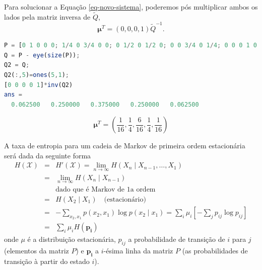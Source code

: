 \begin{questions}
\begin{solution}
\begin{parts}
Para solucionar a Equação \ref{eq-novo-sistema}, poderemos pós multiplicar ambos os lados
pela matriz inversa de $\tilde{Q}$,
\begin{equation}
\mathbf{\mu}^T = (0, 0, 0, 1) \tilde{Q}^{-1} .
\end{equation}


\begin{lstlisting}[language=Octave]
P = [0 1 0 0 0; 1/4 0 3/4 0 0; 0 1/2 0 1/2 0; 0 0 3/4 0 1/4; 0 0 0 1 0];
Q = P - eye(size(P));
Q2 = Q;
Q2(:,5)=ones(5,1);
[0 0 0 0 1]*inv(Q2)
ans =
  0.062500   0.250000   0.375000   0.250000   0.062500
\end{lstlisting}

\begin{equation}
\mathbf{\mu}^T = \left( \frac{1}{16}, \frac{1}{4}, \frac{6}{16}, \frac{1}{4}, \frac{1}{16} \right)
\end{equation}


A taxa de entropia para um cadeia de Markov de primeira ordem
estacionária será dada da seguinte forma
  \begin{eqnarray}
  H(\mathcal{X}) &=& H'(\mathcal{X}) = \lim_{n \rightarrow \infty} H(X_n \mid X_{n-1}, \ldots, X_1) \nonumber \\
        &=& \lim_{n \rightarrow \infty} H(X_n \mid X_{n-1}) \nonumber \\
        && \text{dado que é Markov de 1a ordem} \nonumber \\
        &=& H(X_2 \mid X_1) \quad \text{(estacionário)} \nonumber \\
        &=& - \sum_{x_2, x_1} p(x_2, x_1) \log p(x_2 \mid x_1) = \sum_i \mu_i \left[ - \sum_j p_{ij} \log p_{ij} \right] \nonumber \\
        &=& \sum_i \mu_i H( \mathbf{p_i} )
  \end{eqnarray}
onde $\mu$ é a distribuição estacionária,
$p_{ij}$ a probabilidade de transição de $i$ para $j$ (elementos da matriz $P$)
e $\mathbf{p_i}$ a $i$-ésima linha da matriz $P$ (as probabilidades de transição à partir
do estado $i$).


\end{parts}
\end{solution}
\end{questions}
